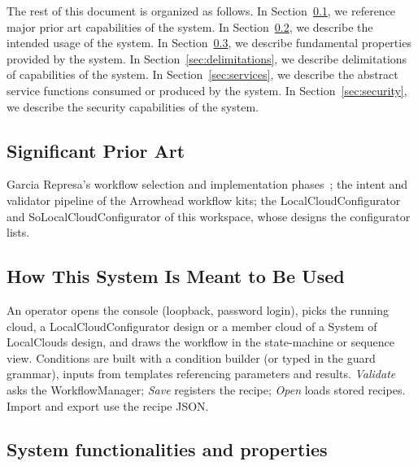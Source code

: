 \documentclass[a4paper]{arrowhead}
\begin{document}
The rest of this document is organized as follows.
In Section~\ref{sec:prior_art}, we reference major prior art capabilities of the system.
In Section~\ref{sec:use}, we describe the intended usage of the system.
In Section~\ref{sec:properties}, we describe fundamental properties provided by the system.
In Section~\ref{sec:delimitations}, we describe delimitations of capabilities of the system.
In Section~\ref{sec:services}, we describe the abstract service functions consumed or produced by the system.
In Section~\ref{sec:security}, we describe the security capabilities of the system.

\newpage
\subsection{Significant Prior Art}
\label{sec:prior_art}
Garcia Represa's workflow selection and implementation phases~\cite{represa2022}; the intent and
validator pipeline of the Arrowhead workflow kits; the LocalCloudConfigurator and SoLocalCloudConfigurator of this
workspace, whose designs the configurator lists.

\subsection{How This System Is Meant to Be Used}
\label{sec:use}
An operator opens the console (loopback, password login), picks the running cloud, a LocalCloudConfigurator
design or a member cloud of a System of LocalClouds design, and draws the workflow in the state-machine or sequence
view. Conditions are built with a condition builder (or typed in the guard grammar), inputs from templates referencing
parameters and results. \emph{Validate} asks the WorkflowManager; \emph{Save} registers the recipe; \emph{Open} loads
stored recipes. Import and export use the recipe JSON.

\subsection{System functionalities and properties}
\label{sec:properties}
\end{document}
